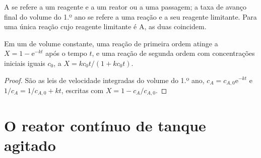 A  se refere a um reagente e a um reator ou a uma passagem; a
taxa de avanço final do volume do 1.º ano se refere a uma reação e a seu
reagente limitante. Para uma única reação cujo reagente limitante é A, as
duas coincidem.

\begin{proposition}\label{prop:b2:continuous-reactors:batch}
Em um  de volume constante, uma reação de primeira ordem
atinge a  $X = 1 - \mathrm e^{-kt}$ após o tempo $t$, e uma reação
de segunda ordem com concentrações iniciais iguais $c_0$, a  $X =
kc_0t/(1 + kc_0t)$.
\end{proposition}

\begin{proof}
São as leis de velocidade integradas do volume do 1.º ano, $c_A = c_{A,0}
\mathrm e^{-kt}$ e $1/c_A = 1/c_{A,0} + kt$, escritas com $X = 1 -
c_A/c_{A,0}$.
\end{proof}

\section{O reator contínuo de tanque agitado}

